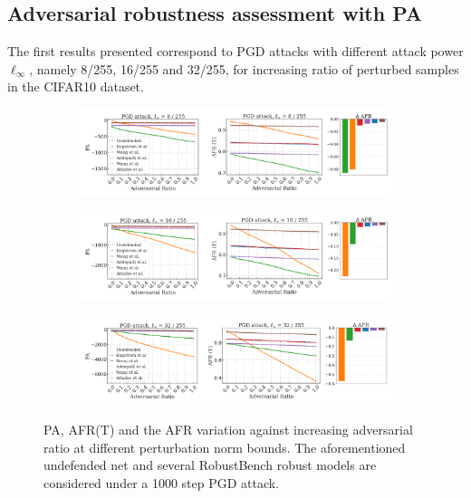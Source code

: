 \subsection{Adversarial robustness assessment with PA}

The first results presented correspond to PGD attacks with different attack power 
$\ell_\infty$, namely 8/255, 16/255 and 32/255, for increasing ratio of 
perturbed samples in the CIFAR10 dataset.

\begin{figure}[H]
    \centering
    \begin{subfigure}[b]{\textwidth}
        \centering
        \includegraphics[width=\textwidth]{img/results_discussion/adversarial/PGD_0.0314_combo.png}
    \end{subfigure}

    \vspace{1em}

    \begin{subfigure}[b]{\textwidth}
        \centering
        \includegraphics[width=\textwidth]{img/results_discussion/adversarial/PGD_0.0627_combo.png}
    \end{subfigure}

    \vspace{1em}

    \begin{subfigure}[b]{\textwidth}
        \centering
        \includegraphics[width=\textwidth]{img/results_discussion/adversarial/PGD_0.1255_combo.png}
    \end{subfigure}

    \caption{PA, AFR(T) and the AFR variation against increasing adversarial ratio at different
    perturbation norm bounds. The aforementioned undefended net and several RobustBench
    robust models are considered under a 1000 step PGD attack.}
    \label{fig:six_figures_pa_adv}
\end{figure}

